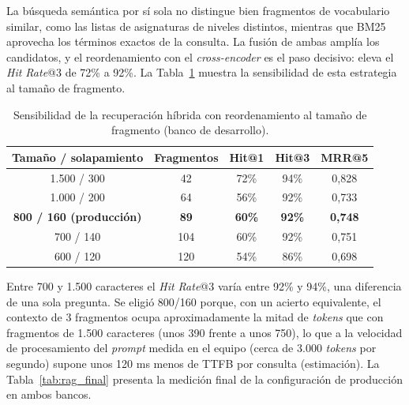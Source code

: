 La búsqueda semántica por sí sola no distingue bien fragmentos de vocabulario similar, como las listas de asignaturas de niveles distintos, mientras que BM25 aprovecha los términos exactos de la consulta. La fusión de ambas amplía los candidatos, y el reordenamiento con el \textit{cross-encoder} es el paso decisivo: eleva el \textit{Hit Rate}@3 de 72\% a 92\%. La Tabla~\ref{tab:chunking} muestra la sensibilidad de esta estrategia al tamaño de fragmento.

\begin{table}[H]
  \caption{Sensibilidad de la recuperación híbrida con reordenamiento al tamaño de fragmento (banco de desarrollo).}
  \label{tab:chunking}
  \centering
  \small
  \renewcommand{\arraystretch}{1.2}
  \begin{tabular}{|c|c|c|c|c|}
    \hline
    \rowcolor[HTML]{EFEFEF}
    \textbf{Tamaño / solapamiento} & \textbf{Fragmentos} & \textbf{Hit@1} & \textbf{Hit@3} & \textbf{MRR@5} \\ \hline
    1.500 / 300 & 42 & 72\% & 94\% & 0,828 \\ \hline
    1.000 / 200 & 64 & 56\% & 92\% & 0,733 \\ \hline
    \textbf{800 / 160 (producción)} & \textbf{89} & \textbf{60\%} & \textbf{92\%} & \textbf{0,748} \\ \hline
    700 / 140 & 104 & 60\% & 92\% & 0,751 \\ \hline
    600 / 120 & 120 & 54\% & 86\% & 0,698 \\ \hline
  \end{tabular}
  \elaboradopor{\autorTFG}
\end{table}

Entre 700 y 1.500 caracteres el \textit{Hit Rate}@3 varía entre 92\% y 94\%, una diferencia de una sola pregunta. Se eligió 800/160 porque, con un acierto equivalente, el contexto de 3 fragmentos ocupa aproximadamente la mitad de \textit{tokens} que con fragmentos de 1.500 caracteres (unos 390 frente a unos 750), lo que a la velocidad de procesamiento del \textit{prompt} medida en el equipo (cerca de 3.000 \textit{tokens} por segundo) supone unos 120 ms menos de TTFB por consulta (estimación). La Tabla~\ref{tab:rag_final} presenta la medición final de la configuración de producción en ambos bancos.

